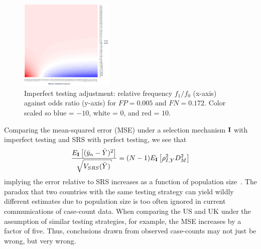 \documentclass[11pt]{amsart}
\def\I{\bf I}
\begin{document}
\begin{figure}[!th]
\centering
\includegraphics[width = 0.4\textwidth]{../methods/figs/mem_heatmap_article.png}
\caption{Imperfect testing adjustment: relative frequency $f_1/f_0$ (x-axis) against odds ratio (y-axis) for $FP=0.005$ and $FN=0.172$. Color scaled so blue = $-10$, white = $0$, and red = $10$.}
\label{fig:heatmap}
\vspace{-0.3cm}
\end{figure}

Comparing the mean-squared error (MSE) under a selection mechanism $\I$ with imperfect testing and SRS with perfect testing, we see that
$$
\frac{E_{\I} \left[ (\bar y_n - \bar Y)^2 \right]}{\sqrt{V_{SRS} (\bar Y)}} = (N-1) E_{\I} \left[ \rho_{I,Y}^2 D_M^2 \right]
$$
implying the error relative to SRS increases as a function of population size~\citep{Meng2018}. The paradox that two countries with the same testing strategy can yield wildly different estimates due to population size is too often ignored in current communications of case-count data.  When comparing the US and UK under the assumption of similar testing strategies, for example, the MSE increases by a factor of five.  Thus, conclusions drawn from observed case-counts may not just be wrong, but very wrong.
\end{document}
